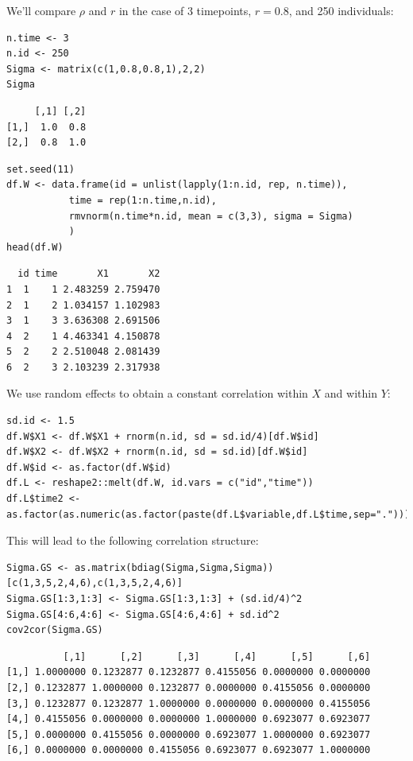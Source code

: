 \documentclass[12pt]{article}
\begin{document}
We'll compare \(\rho\) and \(r\) in the case of 3 timepoints,
\(r=0.8\), and 250 individuals:
\lstset{language=r,label= ,caption= ,captionpos=b,numbers=none}
\begin{lstlisting}
n.time <- 3
n.id <- 250
Sigma <- matrix(c(1,0.8,0.8,1),2,2)
Sigma
\end{lstlisting}

\begin{verbatim}
     [,1] [,2]
[1,]  1.0  0.8
[2,]  0.8  1.0
\end{verbatim}


\lstset{language=r,label= ,caption= ,captionpos=b,numbers=none}
\begin{lstlisting}
set.seed(11)
df.W <- data.frame(id = unlist(lapply(1:n.id, rep, n.time)),
		   time = rep(1:n.time,n.id),
		   rmvnorm(n.time*n.id, mean = c(3,3), sigma = Sigma)
		   )
head(df.W)
\end{lstlisting}

\begin{verbatim}
  id time       X1       X2
1  1    1 2.483259 2.759470
2  1    2 1.034157 1.102983
3  1    3 3.636308 2.691506
4  2    1 4.463341 4.150878
5  2    2 2.510048 2.081439
6  2    3 2.103239 2.317938
\end{verbatim}


\clearpage

We use random effects to obtain a constant correlation within \(X\)
and within \(Y\):
\lstset{language=r,label= ,caption= ,captionpos=b,numbers=none}
\begin{lstlisting}
sd.id <- 1.5
df.W$X1 <- df.W$X1 + rnorm(n.id, sd = sd.id/4)[df.W$id]
df.W$X2 <- df.W$X2 + rnorm(n.id, sd = sd.id)[df.W$id]
df.W$id <- as.factor(df.W$id)
df.L <- reshape2::melt(df.W, id.vars = c("id","time")) 
df.L$time2 <- as.factor(as.numeric(as.factor(paste(df.L$variable,df.L$time,sep="."))))
\end{lstlisting}

This will lead to the following correlation structure:
\lstset{language=r,label= ,caption= ,captionpos=b,numbers=none}
\begin{lstlisting}
Sigma.GS <- as.matrix(bdiag(Sigma,Sigma,Sigma))[c(1,3,5,2,4,6),c(1,3,5,2,4,6)]
Sigma.GS[1:3,1:3] <- Sigma.GS[1:3,1:3] + (sd.id/4)^2
Sigma.GS[4:6,4:6] <- Sigma.GS[4:6,4:6] + sd.id^2
cov2cor(Sigma.GS)
\end{lstlisting}

\begin{verbatim}
          [,1]      [,2]      [,3]      [,4]      [,5]      [,6]
[1,] 1.0000000 0.1232877 0.1232877 0.4155056 0.0000000 0.0000000
[2,] 0.1232877 1.0000000 0.1232877 0.0000000 0.4155056 0.0000000
[3,] 0.1232877 0.1232877 1.0000000 0.0000000 0.0000000 0.4155056
[4,] 0.4155056 0.0000000 0.0000000 1.0000000 0.6923077 0.6923077
[5,] 0.0000000 0.4155056 0.0000000 0.6923077 1.0000000 0.6923077
[6,] 0.0000000 0.0000000 0.4155056 0.6923077 0.6923077 1.0000000
\end{verbatim}
\end{document}

